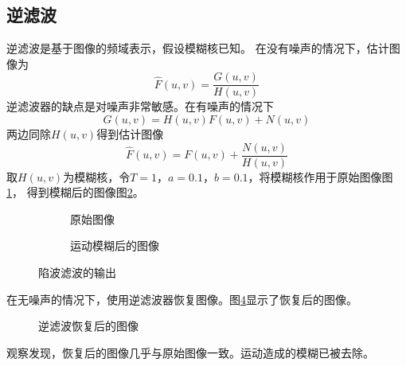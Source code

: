 \documentclass[UTF8]{article}
\begin{document}
\subsection{逆滤波}
    逆滤波是基于图像的频域表示，假设模糊核已知。
    在没有噪声的情况下，估计图像为
    \begin{equation}
        \hat{F}(u,v) = \frac{G(u,v)}{H(u,v)}
        \label{equation10}
    \end{equation}
    逆滤波器的缺点是对噪声非常敏感。在有噪声的情况下
    \begin{equation}
        G(u,v) = H(u,v)F(u,v) + N(u,v)
        \label{equation11}
    \end{equation}
    两边同除$H(u,v)$得到估计图像
    \begin{equation}
    \hat{F}(u,v) = F(u,v) + \frac{N(u,v)}{H(u,v)}
    \label{equation12}
    \end{equation} 
取$H(u,v)$为模糊核，令$T = 1$，$a = 0.1$，$b = 0.1$，将模糊核作用于原始图像图\ref{fig:original_img2}，
得到模糊后的图像图\ref{fig:blurred_img}。
\begin{figure}[htbp]
    \centering
    \begin{subfigure}{0.45\textwidth}
      \centering
      
      \caption{原始图像}
      \label{fig:original_img2}
    \end{subfigure}
    \begin{subfigure}{0.45\textwidth}
      \centering
      
      \caption{运动模糊后的图像}
      \label{fig:blurred_img}
    \end{subfigure}
    \caption{陷波滤波的输出}
    \label{fig:inputs} 
\end{figure}

在无噪声的情况下，使用逆滤波器恢复图像。图\ref{fig:inverse_filter}显示了恢复后的图像。
\begin{figure}[htbp]
    \centering
    
    \caption{逆滤波恢复后的图像}
    \label{fig:inverse_filter}
\end{figure}
观察发现，恢复后的图像几乎与原始图像一致。运动造成的模糊已被去除。
\end{document}
